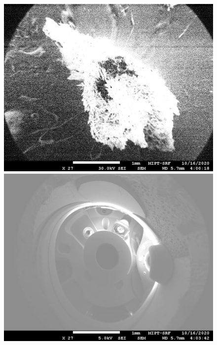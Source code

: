 \documentclass[a4paper]{article}
\begin{document}
\begin{enumerate}
    \begin{figure}[H]
        \begin{center}
        \begin{minipage}[h]{0.45\linewidth}
        \includegraphics[width=1\linewidth]{Foam.jpg}
        \caption{} 
        \label{foam}
        \end{minipage}
        \hfill 
        \begin{minipage}[h]{0.45\linewidth}
        \includegraphics[width=1\linewidth]{Foam01.jpg}
        \caption{}
        \label{foam01}
        \end{minipage}
        \end{center}
    \end{figure}




\end{enumerate}
\end{document}

